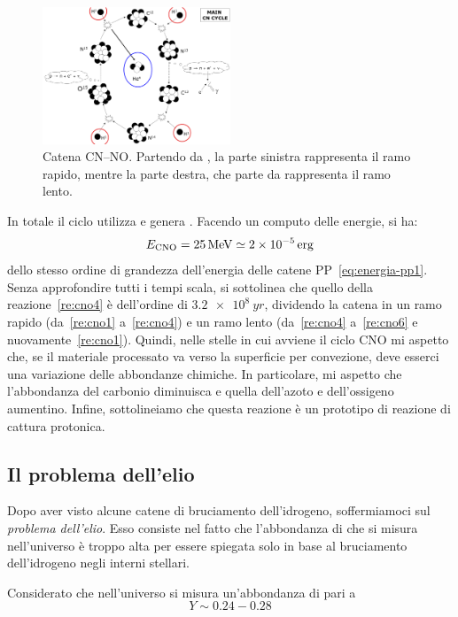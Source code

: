 \begin{figure}
    \centering
    \includegraphics[width=0.5\textwidth]{immagini/catena-cno.png}
    \caption{Catena CN--NO. Partendo da , la parte sinistra rappresenta il ramo rapido, mentre la parte destra, che parte da  rappresenta il ramo lento.}
    \label{fig:catena-cno}
\end{figure}

In totale il ciclo utilizza  e genera . Facendo un computo delle energie, si ha:
\begin{equation}\label{eq:energia-cno}
E_\textup{CNO} = \SI{25}{MeV} \simeq \SI{2e-5}{erg}
\end{equation}
dello stesso ordine di grandezza dell'energia delle catene PP~\eqref{eq:energia-pp1}. Senza approfondire tutti i tempi scala, si sottolinea che quello della reazione~\ref{re:cno4} è dell'ordine di $\SI{3.2e8}{yr}$, dividendo la catena in un ramo rapido (da~\ref{re:cno1} a~\ref{re:cno4}) e un ramo lento (da~\ref{re:cno4} a~\ref{re:cno6} e nuovamente~\ref{re:cno1}). Quindi, nelle stelle in cui avviene il ciclo CNO mi aspetto che, se il materiale processato va verso la superficie per convezione, deve esserci una variazione delle abbondanze chimiche. In particolare, mi aspetto che l'abbondanza del carbonio diminuisca e quella dell'azoto e dell'ossigeno aumentino. Infine, sottolineiamo che questa reazione è un prototipo di reazione di cattura protonica.

\subsection{Il problema dell'elio}
Dopo aver visto alcune catene di bruciamento dell'idrogeno, soffermiamoci sul \emph{problema dell'elio}. Esso consiste nel fatto che l'abbondanza di  che si misura nell'universo è troppo alta per essere spiegata solo in base al bruciamento dell'idrogeno negli interni stellari.

Considerato che nell'universo si misura un'abbondanza di  pari a
\begin{equation}\label{eq:abbondanza-elio-misurata}
    Y \sim 0.24 - 0.28
\end{equation}

